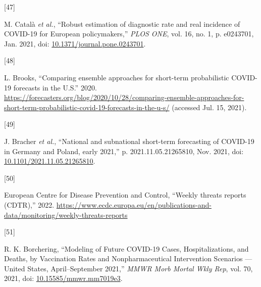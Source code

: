 \documentclass[
]{article}
\newlength{\cslhangindent}
\newlength{\csllabelwidth}
\newlength{\cslentryspacingunit} %
\newenvironment{CSLReferences}[2] %
 {%
  \setlength{\parindent}{0pt}
  \ifodd #1
  \let\oldpar\par
  \def\par{\hangindent=\cslhangindent\oldpar}
  \fi
  \setlength{\parskip}{#2\cslentryspacingunit}
 }%
 {}
\newcommand{\CSLLeftMargin}[1]{\parbox[t]{\csllabelwidth}{#1}}
\newcommand{\CSLRightInline}[1]{\parbox[t]{\linewidth - \csllabelwidth}{#1}\break}
\begin{document}
\begin{CSLReferences}{0}{0}
\leavevmode{}%
\CSLLeftMargin{{[}47{]} }
\CSLRightInline{M. Català \emph{et al.}, {``Robust estimation of diagnostic rate and real incidence of {COVID-19} for {European} policymakers,''} \emph{PLOS ONE}, vol. 16, no. 1, p. e0243701, Jan. 2021, doi: \href{https://doi.org/10.1371/journal.pone.0243701}{10.1371/journal.pone.0243701}.}

\leavevmode{}%
\CSLLeftMargin{{[}48{]} }
\CSLRightInline{L. Brooks, {``Comparing ensemble approaches for short-term probabilistic {COVID-19} forecasts in the {U}.{S}.''} 2020. \url{https://forecasters.org/blog/2020/10/28/comparing-ensemble-approaches-for-short-term-probabilistic-covid-19-forecasts-in-the-u-s/} (accessed Jul. 15, 2021).}

\leavevmode{}%
\CSLLeftMargin{{[}49{]} }
\CSLRightInline{J. Bracher \emph{et al.}, {``National and subnational short-term forecasting of {COVID-19} in {Germany} and {Poland}, early 2021,''} p. 2021.11.05.21265810, Nov. 2021, doi: \href{https://doi.org/10.1101/2021.11.05.21265810}{10.1101/2021.11.05.21265810}.}

\leavevmode{}%
\CSLLeftMargin{{[}50{]} }
\CSLRightInline{European Centre for Disease Prevention and Control, {``Weekly threats reports ({CDTR}),''} 2022. \url{https://www.ecdc.europa.eu/en/publications-and-data/monitoring/weekly-threats-reports}}

\leavevmode{}%
\CSLLeftMargin{{[}51{]} }
\CSLRightInline{R. K. Borchering, {``Modeling of {Future COVID-19 Cases}, {Hospitalizations}, and {Deaths}, by {Vaccination Rates} and {Nonpharmaceutical Intervention Scenarios} --- {United States}, {April}--{September} 2021,''} \emph{MMWR Morb Mortal Wkly Rep}, vol. 70, 2021, doi: \href{https://doi.org/10.15585/mmwr.mm7019e3}{10.15585/mmwr.mm7019e3}.}

\end{CSLReferences}

\newpage
\end{document}
